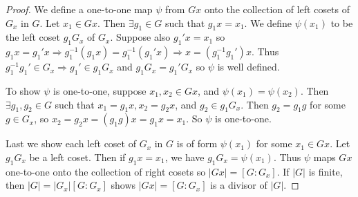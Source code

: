 \documentclass[a4paper,11pt]{article}
\begin{document}
\begin{outline}
    \begin{proof}
      We define a one-to-one map \(\psi\) from \(Gx\) onto the collection of left cosets of \(G_x\) in \(G\). Let \(x_1
      \in Gx\). Then \(\exists g_1 \in G\) such that \(g_1x = x_1\). We define \(\psi(x_1)\) to be the left coset \(g_1G_x\)
      of \(G_x\). Suppose also \(g_1'x = x_1\) so \(g_1x = g_1'x \Rightarrow g_1^{-1}(g_1x) = g_1^{-1}(g_1'x) \Rightarrow
      x = (g_1^{-1}g_1')x\). Thus \(g_1^{-1}g_1' \in G_x \Rightarrow g_1' \in g_1G_x\) and \(g_1G_x = g_1'G_x\) so \(\psi\)
      is well defined.
      
      To show \(\psi\) is one-to-one, suppose \(x_1, x_2 \in Gx\), and \(\psi(x_1) = \psi(x_2)\). Then
      \(\exists g_1, g_2 \in G\) such that \(x_1 = g_1x, x_2 = g_2x\), and \(g_2 \in g_1G_x\). Then \(g_2 = g_1g\) for
      some \(g \in G_x\), so \(x_2 = g_2x = (g_1g)x = g_1x = x_1\). So \(\psi\) is one-to-one.
      
      Last we show each left coset of \(G_x\) in \(G\) is of form \(\psi(x_1)\) for some \(x_1 \in Gx\). 
      Let \(g_1G_x\) be a left coset. Then if \(g_1x = x_1\), we have \(g_1G_x = \psi(x_1)\). Thus \(\psi\) 
      maps \(Gx\) one-to-one onto the collection of right cosets so \(|Gx| = [G:G_x]\). If \(|G|\) is finite, 
      then \(|G| = |G_x|[G:G_x]\) shows \(|Gx| = [G:G_x]\) is a divisor of \(|G|\).
    \end{proof}

\end{outline}
\end{document}
